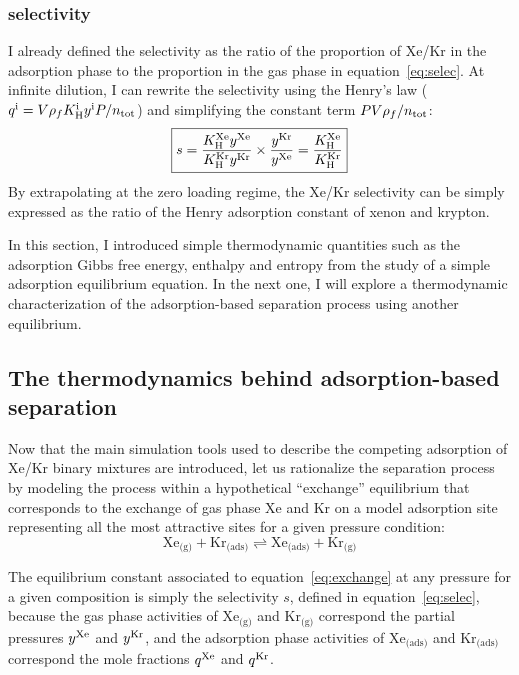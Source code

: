 \documentclass[main.tex]{subfiles}
\begin{document}
\subsubsection{selectivity}

I already defined the selectivity as the ratio of the proportion of Xe/Kr in the adsorption phase to the proportion in the gas phase in equation~\ref{eq:selec}. At infinite dilution, I can rewrite the selectivity using the Henry's law ($q^{\text{i}}=V\rho_f K_{\text{H}}^{\text{i}}y^{\text{i}}P/n_{\text{tot}}$) and simplifying the constant term $PV\rho_f/n_{\text{tot}}$:
\begin{equation}\label{eq:selec_0}
  \boxed{
  s = \dfrac{K_{\text{H}}^{\text{Xe}}y^{\text{Xe}}}{K_{\text{H}}^{\text{Kr}}y^{\text{Kr}}}\times\dfrac{y^{\text{Kr}}}{y^{\text{Xe}}} = \dfrac{K_{\text{H}}^{\text{Xe}}}{K_{\text{H}}^{\text{Kr}}}
  }
\end{equation}
By extrapolating at the zero loading regime, the Xe/Kr selectivity can be simply expressed as the ratio of the Henry adsorption constant of xenon and krypton.

In this section, I introduced simple thermodynamic quantities such as the adsorption Gibbs free energy, enthalpy and entropy from the study of a simple adsorption equilibrium equation. In the next one, I will explore a thermodynamic characterization of the adsorption-based separation process using another equilibrium. 

\subsection{The thermodynamics behind adsorption-based separation}\label{sct:thermo}

Now that the main simulation tools used to describe the competing adsorption of Xe/Kr binary mixtures are introduced, let us rationalize the separation process by modeling the process within a hypothetical ``exchange'' equilibrium that corresponds to the exchange of gas phase Xe and Kr on a model adsorption site representing all the most attractive sites for a given pressure condition:
\begin{equation}\label{eq:exchange}
    \text{Xe}_{\text{(g)}} + \text{Kr}_{\text{(ads)}}
    \rightleftharpoons \text{Xe}_{\text{(ads)}} + \text{Kr}_{\text{(g)}}
\end{equation}

The equilibrium constant associated to equation~\ref{eq:exchange} at any pressure for a given composition is simply the selectivity $s$, defined in equation~\ref{eq:selec}, because the gas phase activities of $\text{Xe}_{\text{(g)}}$ and $\text{Kr}_{\text{(g)}}$ correspond the partial pressures $y^{\text{Xe}}$ and $y^{\text{Kr}}$, and the adsorption phase activities of $\text{Xe}_{\text{(ads)}}$ and $\text{Kr}_{\text{(ads)}}$ correspond the mole fractions $q^{\text{Xe}}$ and $q^{\text{Kr}}$. 
\end{document}
